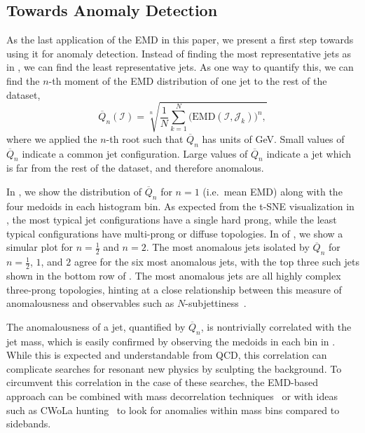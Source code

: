 \documentclass[aps,prd,twocolumn,preprintnumbers,nofootinbib,longbibliography,floatfix,superscriptaddress]{revtex4-1}
\begin{document}
\subsection{Towards Anomaly Detection}
\label{subsec:emd_anomaly}


As the last application of the EMD in this paper, we present a first step towards using it for anomaly detection.
%
Instead of finding the most representative jets as in , we can find the least representative jets.
%
As one way to quantify this, we can find the $n$-th moment of the EMD distribution of one jet to the rest of the dataset,
%
\begin{equation}
\label{eq:barQdef}
\overline{Q}_n(\mathcal{I}) = \sqrt[n]{
\frac{1}{N} \sum_{k=1}^N \Big( \text{EMD}(\mathcal{I},\mathcal{J}_k) \Big)^n,
}
\end{equation}
%
where we applied the $n$-th root such that $\overline{Q}_n$ has units of GeV.
%
Small values of $\overline{Q}_n$ indicate a common jet configuration.
%
Large values of $\overline{Q}_n$ indicate a jet which is far from the rest of the dataset, and therefore anomalous.


In , we show the distribution of $\overline{Q}_n$ for $n =1$ (i.e.~mean EMD) along with the four medoids in each histogram bin.
%
As expected from the t-SNE visualization in , the most typical jet configurations have a single hard prong, while the least typical configurations have multi-prong or diffuse topologies.
%
In  of , we show a simular plot for $n=\frac12$ and $n=2$.
%
The most anomalous jets isolated by $\overline{Q}_n$ for $n=\frac12$, $1$, and $2$ agree for the six most anomalous jets, with the top three such jets shown in the bottom row of .
%
The most anomalous jets are all highly complex three-prong topologies, hinting at a close relationship between this measure of anomalousness and observables such as $N$-subjettiness~\cite{Thaler:2010tr,Thaler:2011gf}.


The anomalousness of a jet, quantified by $\overline{Q}_n$, is nontrivially correlated with the jet mass, which is easily confirmed by observing the medoids in each bin in .
%
While this is expected and understandable from QCD, this correlation can complicate searches for resonant new physics by sculpting the background.
%
To circumvent this correlation in the case of these searches, the EMD-based approach can be combined with mass decorrelation techniques~\cite{Dolen:2016kst,Shimmin:2017mfk,Moult:2017okx} or with ideas such as CWoLa hunting~\cite{Collins:2018epr} to look for anomalies within mass bins compared to sidebands.
\end{document}
